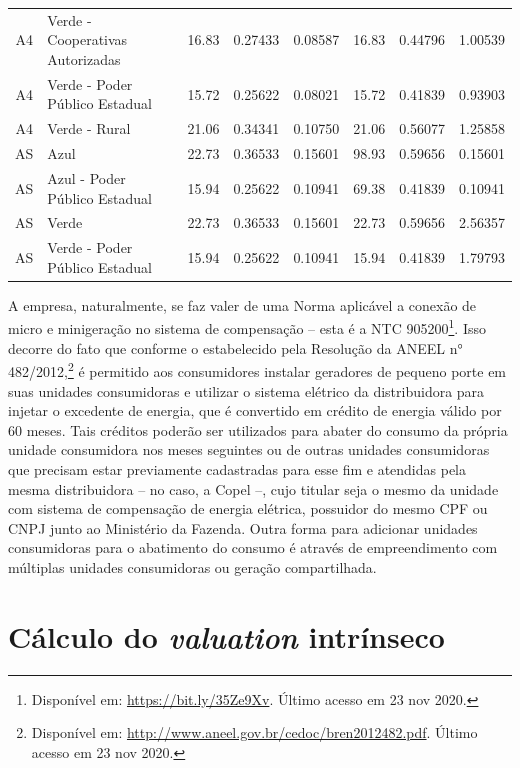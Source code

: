 \documentclass[grad,numbers]{coppe}
\begin{document}
\begin{longtable}[t]{c>{\centering\arraybackslash}p{8em}cccccc}
  A4 & Verde - Cooperativas Autorizadas & 16.83 & 0.27433 & 0.08587 & 16.83 & 0.44796 & 1.00539\\
  \addlinespace
  A4 & Verde - Poder Público Estadual & 15.72 & 0.25622 & 0.08021 & 15.72 & 0.41839 & 0.93903\\
  A4 & Verde - Rural & 21.06 & 0.34341 & 0.10750 & 21.06 & 0.56077 & 1.25858\\
  AS & Azul & 22.73 & 0.36533 & 0.15601 & 98.93 & 0.59656 & 0.15601\\
  AS & Azul - Poder Público Estadual & 15.94 & 0.25622 & 0.10941 & 69.38 & 0.41839 & 0.10941\\
  AS & Verde & 22.73 & 0.36533 & 0.15601 & 22.73 & 0.59656 & 2.56357\\
  \addlinespace
  AS & Verde - Poder Público Estadual & 15.94 & 0.25622 & 0.10941 & 15.94 & 0.41839 & 1.79793\\*
  \end{longtable}
  \endgroup{}

  A empresa, naturalmente, se faz valer de uma Norma aplicável a conexão de micro e minigeração no sistema de compensação -- esta é a NTC 905200\footnote{Disponível em: \url{https://bit.ly/35Ze9Xv}. Último acesso em 23 nov 2020.}. Isso decorre do fato que conforme o estabelecido pela Resolução da ANEEL n° 482/2012,\footnote{Disponível em: \url{http://www.aneel.gov.br/cedoc/bren2012482.pdf}. Último acesso em 23 nov 2020.} é permitido aos consumidores instalar geradores de pequeno porte em suas unidades consumidoras e utilizar o sistema elétrico da distribuidora para injetar o excedente de energia, que é convertido em crédito de energia válido por 60 meses. Tais créditos poderão ser utilizados para abater do consumo da própria unidade consumidora nos meses seguintes ou de outras unidades consumidoras que precisam estar previamente cadastradas para esse fim e atendidas pela mesma distribuidora -- no caso, a Copel --, cujo titular seja o mesmo da unidade com sistema de compensação de energia elétrica, possuidor do mesmo CPF ou CNPJ junto ao Ministério da Fazenda. Outra forma para adicionar unidades consumidoras para o abatimento do consumo é através de empreendimento com múltiplas unidades consumidoras ou geração compartilhada.

  \hypertarget{cuxe1lculo-do-valuation-intruxednseco}{%
  \section{\texorpdfstring{Cálculo do \emph{valuation} intrínseco}{Cálculo do valuation intrínseco}}\label{cuxe1lculo-do-valuation-intruxednseco}}
\end{document}
